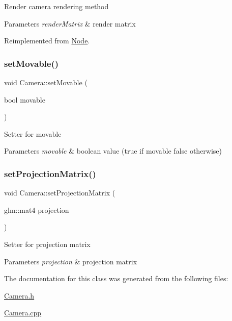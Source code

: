 Render camera rendering method 
\begin{DoxyParams}{Parameters}
{\em render\+Matrix} & render matrix \\
\hline
\end{DoxyParams}


Reimplemented from \hyperlink{classNode_a7faebb78a04b6421dbf5afe998f7658d}{Node}.

\mbox{\label{classCamera_afea7920e4a36865a5062a05eb6a381ed}} 
\subsubsection{\texorpdfstring{set\+Movable()}{setMovable()}}
{\footnotesize\ttfamily void Camera\+::set\+Movable (\begin{DoxyParamCaption}\item[{bool}]{movable }\end{DoxyParamCaption})}

Setter for movable 
\begin{DoxyParams}{Parameters}
{\em movable} & boolean value (true if movable false otherwise) \\
\hline
\end{DoxyParams}
\mbox{\label{classCamera_a153d920e646e06c882606e38ef23df9a}} 
\subsubsection{\texorpdfstring{set\+Projection\+Matrix()}{setProjectionMatrix()}}
{\footnotesize\ttfamily void Camera\+::set\+Projection\+Matrix (\begin{DoxyParamCaption}\item[{glm\+::mat4}]{projection }\end{DoxyParamCaption})}

Setter for projection matrix 
\begin{DoxyParams}{Parameters}
{\em projection} & projection matrix \\
\hline
\end{DoxyParams}


The documentation for this class was generated from the following files\+:\begin{DoxyCompactItemize}
\item 
\hyperlink{Camera_8h}{Camera.\+h}\item 
\hyperlink{Camera_8cpp}{Camera.\+cpp}\end{DoxyCompactItemize}
